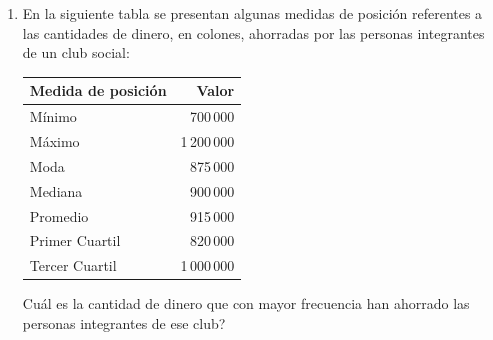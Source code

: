 \documentclass[12pt]{article}
\begin{document}
\begin{enumerate}[label=\textbf{\arabic*.}, itemsep=2.5cm]
\begin{center}
\end{center}

De acuerdo con la informaci\'on anterior, si $2\,\mathrm{h}$ corresponde al promedio de esos datos, entonces la mediana de los tiempos que tardaron los ciclistas en recorrer esa ruta, es

\begin{enumerate}[label=\Alph*)]
  \item menor que $2\,\mathrm{h}$
  \item mayor que $2\,\mathrm{h}$
  \item igual que $2\,\mathrm{h}$
  \item Ninguna
\end{enumerate}

\Needspace{0.62\textheight}
\item
En la siguiente tabla se presentan algunas medidas de posici\'on referentes a las cantidades de dinero, en colones, ahorradas por las personas integrantes de un club social:

\begin{center}
\begin{tabular}{|l|r|}
\hline
\textbf{Medida de posici\'on} & \textbf{Valor} \\
\hline
M\'inimo         & 700\,000 \\
M\'aximo         & 1\,200\,000 \\
Moda           & 875\,000 \\
Mediana        & 900\,000 \\
Promedio       & 915\,000 \\
Primer Cuartil & 820\,000 \\
Tercer Cuartil & 1\,000\,000 \\
\hline
\end{tabular}
\end{center}

\textquestiondown Cu\'al es la cantidad de dinero que con mayor frecuencia han ahorrado las personas integrantes de ese club?


\end{enumerate}
\end{document}
